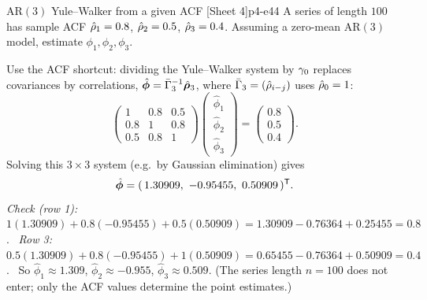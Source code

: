 \begin{exercise}{AR$(3)$ Yule--Walker from a given ACF \quad\textnormal{[Sheet 4]}}{p4-e44}
A series of length $100$ has sample ACF $\hat{\rho}_1=0.8$, $\hat{\rho}_2=0.5$,
$\hat{\rho}_3=0.4$. Assuming a zero-mean AR$(3)$ model, estimate
$\phi_1,\phi_2,\phi_3$.
\end{exercise}
\begin{solution}
Use the ACF shortcut: dividing the Yule--Walker system by $\gamma_0$ replaces
covariances by correlations, $\hat{\boldsymbol\phi}=\bar\Gamma_3^{-1}\hat{\boldsymbol{\rho}}_3$,
where $\bar\Gamma_3=(\hat{\rho}_{i-j})$ uses $\hat{\rho}_0=1$:
\[
\begin{pmatrix}1 & 0.8 & 0.5\\ 0.8 & 1 & 0.8\\ 0.5 & 0.8 & 1\end{pmatrix}
\begin{pmatrix}\hat\phi_1\\ \hat\phi_2\\ \hat\phi_3\end{pmatrix}
=\begin{pmatrix}0.8\\ 0.5\\ 0.4\end{pmatrix}.
\]
Solving this $3\times3$ system (e.g.\ by Gaussian elimination) gives
\[
\hat{\boldsymbol\phi}=(\,1.30909,\ -0.95455,\ 0.50909\,)\Tr .
\]
\textit{Check (row 1):} $1(1.30909)+0.8(-0.95455)+0.5(0.50909)
=1.30909-0.76364+0.25455=0.8$.\ \checkmark\;
\textit{Row 3:} $0.5(1.30909)+0.8(-0.95455)+1(0.50909)
=0.65455-0.76364+0.50909=0.4$.\ \checkmark\;
So $\hat\phi_1\approx1.309$, $\hat\phi_2\approx-0.955$,
$\hat\phi_3\approx0.509$. (The series length $n=100$ does not enter; only the
ACF values determine the point estimates.)
\end{solution}

